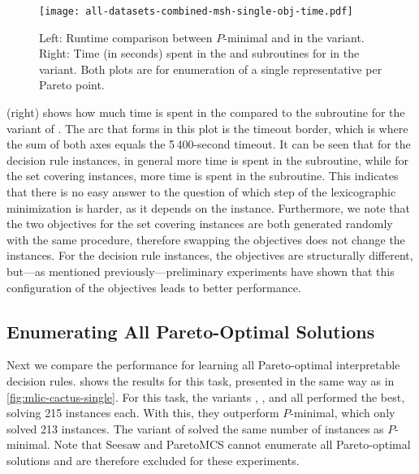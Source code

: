 \begin{figure}
  \centering
  \texttt{[image: all-datasets-combined-msh-single-obj-time.pdf]}
  \caption{Left: Runtime comparison between $P$-minimal and \algname{} in the \msh{} variant.
    Right: Time (in seconds) spent in the \Min{} and \Simpr{} subroutines for \algname{} in the \msh{} variant.
    Both plots are for enumeration of a single representative per Pareto point.
  }\label{fig:combined-msh-single-obj-time}
\end{figure}

 (right) shows how much time is spent in the \Min{} compared to the \Simpr{} subroutine for the \msh{} variant of \algname{}.
The arc that forms in this plot is the timeout border, which is where the sum of both axes equals the 5\,400-second timeout.
It can be seen that for the decision rule instances, in general more time is spent in the \Simpr{} subroutine, while for the set covering instances, more time is spent in the \Min{} subroutine.
This indicates that there is no easy answer to the question of which step of the lexicographic minimization is harder, as it depends on the instance.
Furthermore, we note that the two objectives for the set covering instances are both generated randomly with the same procedure, therefore swapping the objectives does not change the instances.
For the decision rule instances, the objectives are structurally different, but---as mentioned previously---preliminary experiments have shown that this configuration of the objectives leads to better performance.

\subsection{Enumerating All Pareto-Optimal Solutions}

Next we compare the performance for learning all Pareto-optimal interpretable decision rules.
 shows the results for this task, presented in the same way as in \cref{fig:mlic-cactus-single}.
For this task, the \algname{} variants \satunsat{}, \unsatsat{}, \msu{} and \msh{} all performed the best, solving 215 instances each.
With this, they outperform $P$-minimal, which only solved 213 instances.
The \oll{} variant of \algname{} solved the same number of instances as $P$-minimal.
Note that Seesaw and ParetoMCS cannot enumerate all Pareto-optimal solutions and are therefore excluded for these experiments.

